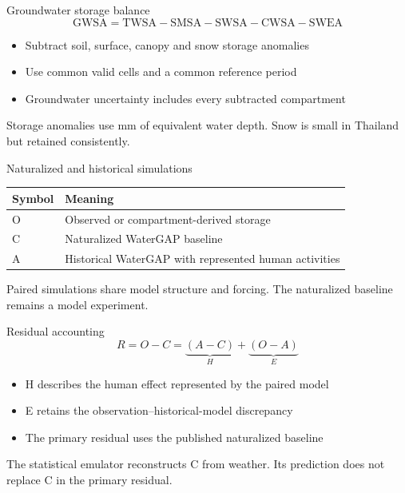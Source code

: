 \documentclass[aspectratio=169,11pt]{beamer}
\newcommand{\sourcenote}[1]{\vfill\par{\fontsize{7.1}{8.4}\selectfont\color{researchnavy!75}#1}}
\begin{document}
\begin{frame}{Groundwater storage balance}
\[ \mathrm{GWSA}=\mathrm{TWSA}-\mathrm{SMSA}-\mathrm{SWSA}-\mathrm{CWSA}-\mathrm{SWEA} \]
\begin{itemize}\setlength{\itemsep}{3mm}
\item Subtract soil, surface, canopy and snow storage anomalies
\item Use common valid cells and a common reference period
\item Groundwater uncertainty includes every subtracted compartment
\end{itemize}
\sourcenote{Storage anomalies use mm of equivalent water depth. Snow is small in Thailand but retained consistently.}
\end{frame}
\begin{frame}{Naturalized and historical simulations}
\small\setlength{\tabcolsep}{3pt}\renewcommand{\arraystretch}{1.35}\begin{tabular}{>{\raggedright\arraybackslash}p{}>{\raggedright\arraybackslash}p{}}\toprule
\textbf{Symbol} & \textbf{Meaning}\\\midrule
O & Observed or compartment-derived storage\\
C & Naturalized WaterGAP baseline\\
A & Historical WaterGAP with represented human activities\\
\bottomrule\end{tabular}
\sourcenote{Paired simulations share model structure and forcing. The naturalized baseline remains a model experiment.}
\end{frame}
\begin{frame}{Residual accounting}
\[ R=O-C=\underbrace{(A-C)}_{H}+\underbrace{(O-A)}_{E} \]
\begin{itemize}\setlength{\itemsep}{3mm}
\item H describes the human effect represented by the paired model
\item E retains the observation–historical-model discrepancy
\item The primary residual uses the published naturalized baseline
\end{itemize}
\sourcenote{The statistical emulator reconstructs C from weather. Its prediction does not replace C in the primary residual.}
\end{frame}
\end{document}
